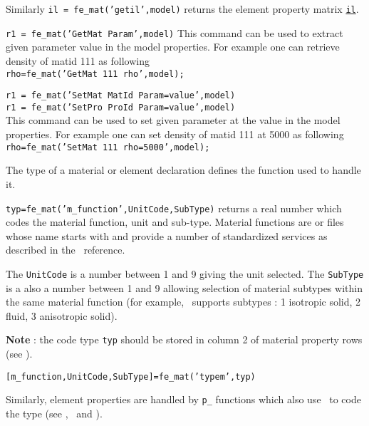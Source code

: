 Similarly {\tt il = fe\_mat('getil',model)} returns the element property matrix \hyperlink{il}{{\tt il}}.

 
{\tt r1 = fe\_mat('GetMat {\ti Param}',model)}
This command can be used to extract given parameter  value in the model properties.
For example one can retrieve density of matid 111 as following\\
{\tt rho=fe\_mat('GetMat 111 rho',model);}\\

 
{\tt r1 = fe\_mat('SetMat {\ti MatId}  {\ti Param}={\ti value}',model)}\\
{\tt r1 = fe\_mat('SetPro {\ti ProId}  {\ti Param}={\ti value}',model)}\\

This command can be used to set given parameter  at the value  in the model properties. 
For example one can set density of matid 111 at 5000 as following\\
{\tt rho=fe\_mat('SetMat 111 rho=5000',model);}\\


 The type of a material or element declaration defines the function used to handle it.  

{\tt typ=fe\_mat('m\_function',UnitCode,SubType)} returns a real number which codes the material function, unit and sub-type. 
Material functions are  or  files whose name starts with  and provide a number of standardized services as described in the \melastic\ reference. 

The {\tt UnitCode} is a number between 1 and 9 giving the unit selected. The {\tt SubType} is a also a number between 1 and 9 allowing selection of material subtypes within the same material function (for example, \melastic\ supports subtypes : 1 isotropic solid, 2 fluid, 3 anisotropic solid).

{\bf Note} : the code type {\tt typ} should be stored in column 2 of material property rows (see ).

{\tt [m\_function,UnitCode,SubType]=fe\_mat('typem',typ)}

Similarly, element properties are handled by {\tt p\_} functions which also use \femat\ to code the type (see \pbeam, \pshell\ and \psolid).

